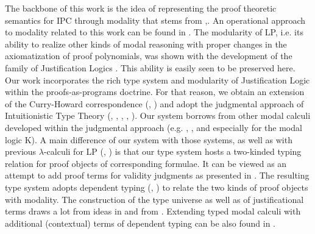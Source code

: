 The backbone of this work is the idea of representing the proof theoretic semantics for {\sf IPC} through modality that stems from \cite{Art01BSL},\cite{Art02CSLI}.  An operational approach to  modality related to this work can be found in \cite{Art95TR}. The modularity of {\sf LP}, i.e. its ability to realize other kinds of modal reasoning with proper changes in the axiomatization of proof polynomials, was shown with the development of the family of Justification Logics \cite{DBLP:conf/jelia/Artemov08}. This ability is easily seen to be preserved here. Our work incorporates the rich type system and modularity of Justification Logic within the proofs-as-programs doctrine. For that reason, we obtain an  extension of the Curry-Howard correspondence (\cite{Sorensen98lectureson}, \cite{citeulike:993095}) and adopt the judgmental approach of Intuitionistic Type Theory (\cite{inp:martin-loef79a}, \cite{martin-lof84:inttt}, \cite{citeulike:5251552}, \cite{citeulike:2310446}, \cite{awodey:kripke}). Our system borrows from other modal calculi developed  within the judgmental approach  (e.g. \cite{citeulike:5447115}, \cite{Goubault-Larrecq96oncomputational},\cite{Benaissa99logicalmodalities} and especially \cite{Bellin01extendedcurry-howard} for the modal logic {\sf K}). A main difference of our system with those systems, as well as with previous $\lambda$-calculi for {\sf LP} (\cite{AA00}, \cite{ArtBon07LFCS}) is that our type system  hosts a two-kinded typing relation for proof objects of corresponding formulae. It can be viewed as an attempt to add proof terms for validity judgments as presented in \cite{citeulike:5447115}.  The resulting type system adopts dependent typing (\cite{citeulike:4846}, \cite{Norell08dependentlytyped}) to relate the two kinds of proof objects with modality.  The construction of the type universe as well as of justificational terms draws a lot from ideas in \cite{Artemov:2012:OJL:2317882.2317912}  and from \cite{FittingManuscript-FITTLO}. Extending typed modal calculi with additional (contextual) terms of dependent typing can be also found in \cite{Nanevski:2008:CMT:1352582.1352591}. 
